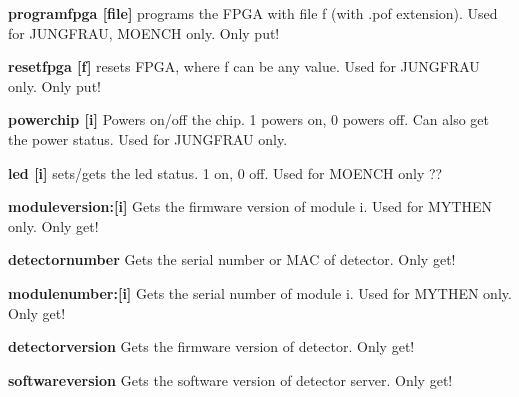 \begin{DoxyItemize}
\item {\bfseries programfpga \mbox{[}file\mbox{]}} programs the FPGA with file f (with .pof extension). Used for JUNGFRAU, MOENCH only. Only put!
\end{DoxyItemize}


\begin{DoxyItemize}
\item {\bfseries resetfpga \mbox{[}f\mbox{]}} resets FPGA, where f can be any value. Used for JUNGFRAU only. Only put!
\end{DoxyItemize}


\begin{DoxyItemize}
\item {\bfseries powerchip \mbox{[}i\mbox{]}} Powers on/off the chip. 1 powers on, 0 powers off. Can also get the power status. Used for JUNGFRAU only.
\end{DoxyItemize}


\begin{DoxyItemize}
\item {\bfseries led \mbox{[}i\mbox{]}} sets/gets the led status. 1 on, 0 off. Used for MOENCH only ??
\end{DoxyItemize}


\begin{DoxyItemize}
\item {\bfseries moduleversion:\mbox{[}i\mbox{]}} Gets the firmware version of module i. Used for MYTHEN only. Only get!
\end{DoxyItemize}


\begin{DoxyItemize}
\item {\bfseries detectornumber} Gets the serial number or MAC of detector. Only get!
\end{DoxyItemize}


\begin{DoxyItemize}
\item {\bfseries modulenumber:\mbox{[}i\mbox{]}} Gets the serial number of module i. Used for MYTHEN only. Only get!
\end{DoxyItemize}


\begin{DoxyItemize}
\item {\bfseries detectorversion} Gets the firmware version of detector. Only get!
\end{DoxyItemize}


\begin{DoxyItemize}
\item {\bfseries softwareversion} Gets the software version of detector server. Only get!
\end{DoxyItemize}



